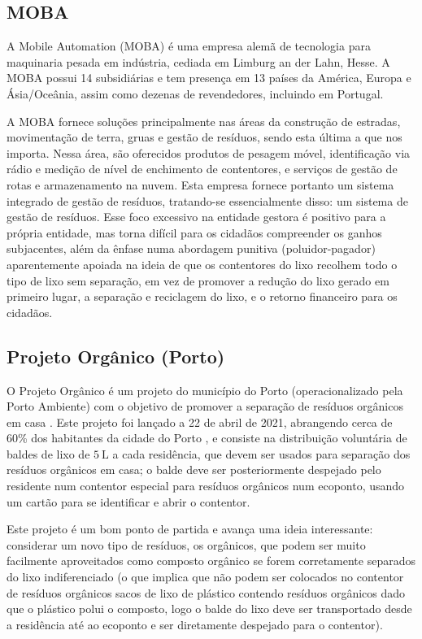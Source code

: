 \documentclass[11pt, a4paper, oneside]{book}
\begin{document}
\subsection{MOBA}

A Mobile Automation (MOBA) é uma empresa alemã de tecnologia para maquinaria pesada em indústria, cediada em Limburg an der Lahn, Hesse. A MOBA possui 14 subsidiárias e tem presença em 13 países da América, Europa e Ásia/Oceânia, assim como dezenas de revendedores, incluindo em Portugal.

A MOBA fornece soluções principalmente nas áreas da construção de estradas, movimentação de terra, gruas e gestão de resíduos, sendo esta última a que nos importa. Nessa área, são oferecidos produtos de pesagem móvel, identificação via rádio e medição de nível de enchimento de contentores, e serviços de gestão de rotas e armazenamento na nuvem. Esta empresa fornece portanto um sistema integrado de gestão de resíduos, tratando-se essencialmente disso: um sistema de gestão de resíduos. Esse foco excessivo na entidade gestora é positivo para a própria entidade, mas torna difícil para os cidadãos compreender os ganhos subjacentes, além da ênfase numa abordagem punitiva (poluidor-pagador) aparentemente apoiada na ideia de que os contentores do lixo recolhem todo o tipo de lixo sem separação, em vez de promover a redução do lixo gerado em primeiro lugar, a separação e reciclagem do lixo, e o retorno financeiro para os cidadãos.

\subsection{Projeto Orgânico (Porto)}

O Projeto Orgânico é um projeto do município do Porto (operacionalizado pela Porto Ambiente) com o objetivo de promover a separação de resíduos orgânicos em casa \cite{organico-home}. Este projeto foi lançado a 22 de abril de 2021, abrangendo cerca de 60\% dos habitantes da cidade do Porto \cite{organico-news}, e consiste na distribuição voluntária de baldes de lixo de $\SI{5}{\liter}$ a cada residência, que devem ser usados para separação dos resíduos orgânicos em casa; o balde deve ser posteriormente despejado pelo residente num contentor especial para resíduos orgânicos num ecoponto, usando um cartão para se identificar e abrir o contentor.

Este projeto é um bom ponto de partida e avança uma ideia interessante: considerar um novo tipo de resíduos, os orgânicos, que podem ser muito facilmente aproveitados como composto orgânico se forem corretamente separados do lixo indiferenciado (o que implica que não podem ser colocados no contentor de resíduos orgânicos sacos de lixo de plástico contendo resíduos orgânicos dado que o plástico polui o composto, logo o balde do lixo deve ser transportado desde a residência até ao ecoponto e ser diretamente despejado para o contentor).
\end{document}
